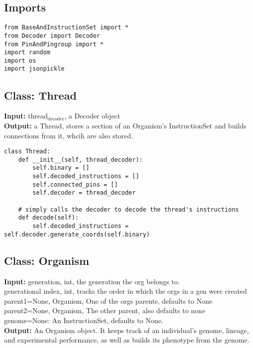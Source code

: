 \documentclass[a4paper]{article}
\begin{document}
\subsection{Imports}
\label{sec-7-1}
\begin{verbatim}
from BaseAndInstructionSet import *
from Decoder import Decoder
from PinAndPingroup import *
import random
import os
import jsonpickle
\end{verbatim}
\subsection{Class: Thread}
\label{sec-7-2}
\textbf{Input:} thread$_{\text{decoder}}$, a Decoder object\\
\textbf{Output:} a Thread, stores a section of an Organism’s InstructionSet and builds connections from it, whcih are also stored.\\
\begin{verbatim}
class Thread:
    def __init__(self, thread_decoder):
        self.binary = []
        self.decoded_instructions = []
        self.connected_pins = []
        self.decoder = thread_decoder

    # simply calls the decoder to decode the thread's instructions
    def decode(self):
        self.decoded_instructions = self.decoder.generate_coords(self.binary)
\end{verbatim}
\subsection{Class: Organism}
\label{sec-7-3}
\textbf{Input:} generation, int,  the generation the org belongs to.\\
\indent generational index, int, tracks the order in which the orgs in a gen were created\\
\indent parent1=None, Organism, One of the orgs parents, defaults to None\\
\indent parent2=None, Organism, The other parent, also defaults to none\\
\indent genome=None: An InstructionSet, defaults to None.\\
\textbf{Output:} An Organism object. It keeps track of an individual’s genome, lineage, and experimental performance, as well as builds its phenotype from the genome.\\
\end{document}
